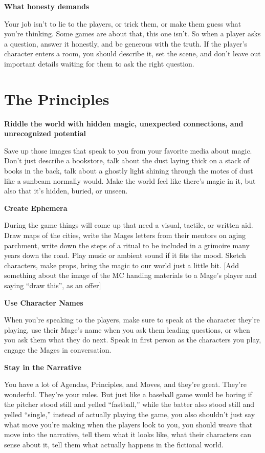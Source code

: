 \documentclass[
  oneside,
  statementpaper,
  9pt]{memoir}
\begin{document}
\textbf{What honesty demands}

Your job isn't to lie to the players, or trick them, or make them guess
what you're thinking. Some games are about that, this one isn't. So when
a player asks a question, answer it honestly, and be generous with the
truth. If the player's character enters a room, you should describe it,
set the scene, and don't leave out important details waiting for them to
ask the right question.

\hypertarget{the-principles}{%
\section{The Principles}\label{the-principles}}

\textbf{Riddle the world with hidden magic, unexpected connections, and
unrecognized potential}

Save up those images that speak to you from your favorite media about
magic. Don't just describe a bookstore, talk about the dust laying thick
on a stack of books in the back, talk about a ghostly light shining
through the motes of dust like a sunbeam normally would. Make the world
feel like there's magic in it, but also that it's hidden, buried, or
unseen.

\textbf{Create Ephemera}

During the game things will come up that need a visual, tactile, or
written aid. Draw maps of the cities, write the Mages letters from their
mentors on aging parchment, write down the steps of a ritual to be
included in a grimoire many years down the road. Play music or ambient
sound if it fits the mood. Sketch characters, make props, bring the
magic to our world just a little bit. {[}Add something about the image
of the MC handing materials to a Mage's player and saying ``draw this'',
as an offer{]}

\textbf{Use Character Names}

When you're speaking to the players, make sure to speak at the character
they're playing, use their Mage's name when you ask them leading
questions, or when you ask them what they do next. Speak in first person
as the characters you play, engage the Mages in conversation.

\textbf{Stay in the Narrative}

You have a lot of Agendas, Principles, and Moves, and they're great.
They're wonderful. They're your rules. But just like a baseball game
would be boring if the pitcher stood still and yelled ``fastball,''
while the batter also stood still and yelled ``single,'' instead of
actually playing the game, you also shouldn't just say what move you're
making when the players look to you, you should weave that move into the
narrative, tell them what it looks like, what their characters can sense
about it, tell them what actually happens in the fictional world.
\end{document}
